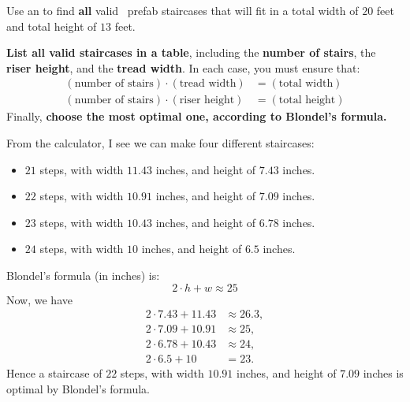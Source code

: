 \documentclass[noauthor,nooutcomes,handout,12pt]{ximera}
\begin{document}
\begin{question}
  Use an  to
  find \textbf{all} valid \mooculus~prefab staircases that will fit in
  a total width of $20$ feet and total height of $13$ feet.

  \textbf{List all valid staircases in a table}, including the
  \textbf{number of stairs}, the \textbf{riser height}, and the
  \textbf{tread width}. In each case, you must ensure that:
  \begin{align*}
    (\text{number of stairs}) \cdot (\text{tread width}) &= (\text{total width})\\
    (\text{number of stairs}) \cdot (\text{riser height}) &= (\text{total height})
  \end{align*}
  Finally, \textbf{choose the most optimal one,
 according to Blondel's formula.}

  \begin{freeResponse}
    From the calculator, I see we can make four different staircases:
    \begin{itemize}
    \item $21$ steps, with width $11.43$ inches, and height of $7.43$ inches.
    \item $22$ steps, with width $10.91$ inches, and height of $7.09$ inches.
    \item $23$ steps, with width $10.43$ inches, and height of $6.78$ inches.
    \item $24$ steps, with width $10$ inches, and height of $6.5$ inches.
    \end{itemize}
    Blondel's formula (in inches) is:
    \[
    2\cdot h + w \approx 25
    \]
    Now, we have
    \begin{align*}
      2\cdot 7.43 + 11.43 &\approx 26.3,\\
      2\cdot 7.09 + 10.91 &\approx 25,\\
      2\cdot 6.78 + 10.43 &\approx 24,\\
      2\cdot 6.5 + 10 &= 23.
    \end{align*}
    Hence a staircase of $22$ steps, with width $10.91$ inches, and
    height of $7.09$ inches is optimal by Blondel's formula.
  \end{freeResponse}
\end{question}
\mynewpage
\end{document}
